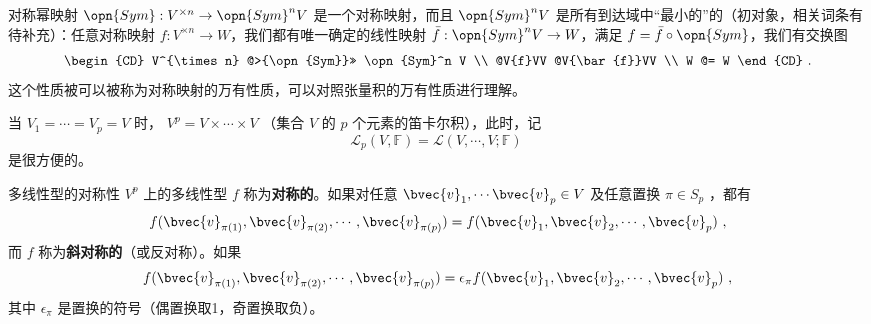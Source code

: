 
对称幂映射 $\opn{Sym}: V^{\times n} \to \opn{Sym}^n V$ 是一个对称映射，而且 $\opn{Sym}^n V$ 是所有到达域中“最小的”的（初对象，相关词条有待补充）：任意对称映射 $f: V^{\times n} \to W$，我们都有唯一确定的线性映射 $\bar{f}: \opn{Sym}^n V \to W$，满足 $f = \bar{f} \circ \opn{Sym}$，我们有交换图
\begin{equation}
\begin{CD}
V^{\times n} @>{\opn{Sym}}>> \opn{Sym}^n V \\
@V{f}VV @V{\bar{f}}VV \\
W @= W
\end{CD}~.
\end{equation}
这个性质被可以被称为对称映射的万有性质，可以对照张量积的万有性质进行理解。


当 $V_1=\cdots=V_p=V$ 时， $V^p=V\times\cdots\times V$ （集合 $V$ 的 $p$ 个元素的笛卡尔积），此时，记
\begin{equation}
\mathcal{L}_p(V,\mathbb{F})=\mathcal{L}(V,\cdots,V;\mathbb{F})~
\end{equation}
是很方便的。

\begin{definition}{多线性型的对称性}\label{def_MulMap_1}
$V^p$ 上的多线性型 $f$ 称为\textbf{对称的}。如果对任意 $\bvec{v}_1,\cdots\bvec{v}_p \in V$ 及任意置换 $\pi\in S_p$ ，都有
\begin{equation}
f(\bvec{v}_{\pi(1)},\bvec{v}_{\pi(2)},\cdots,\bvec{v}_{\pi(p)})=f(\bvec{v}_1,\bvec{v}_2,\cdots,\bvec{v}_p)~,
\end{equation}
而 $f$ 称为\textbf{斜对称的}（或反对称）。如果
\begin{equation}
f(\bvec{v}_{\pi(1)},\bvec{v}_{\pi(2)},\cdots,\bvec{v}_{\pi(p)})=\epsilon_\pi f(\bvec{v}_1,\bvec{v}_2,\cdots,\bvec{v}_p)~,
\end{equation}
其中 $\epsilon_\pi$ 是置换的符号（偶置换取1，奇置换取负）。
\end{definition}
